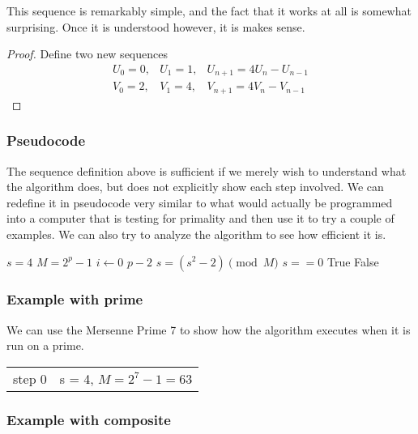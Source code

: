 This sequence is remarkably simple, and the fact that it works at all is somewhat surprising. Once it is understood however, it is makes sense.  
\begin{proof}
Define two new sequences
\begin{align}
U_0 = 0,& U_1 = 1,& U_{n+1} = 4U_n - U_{n-1}\\ 
V_0 = 2,& V_1 = 4,& V_{n+1} = 4V_n - V_{n-1}
\end{align}
\end{proof}



\subsubsection{Pseudocode}

The sequence definition above is sufficient if we merely wish to understand what the algorithm does, but does not explicitly show each step involved.  We can redefine it in pseudocode very similar to what would actually be programmed into a computer that is testing for primality and then use it to try a couple of examples. We can also try to analyze the algorithm to see how efficient it is.

\begin{codebox}
\li$s = 4$
\li$M = 2^p - 1$
\li \For $i \gets 0$ \To $p - 2$
\Do\li
$s = (s^2 - 2) \pmod{M}$
\End\li
\If $s == 0$
\Then
\li\Return True \li
\Else
\li\Return False \li
\End
\end{codebox}

\subsubsection{Example with prime}

We can use the Mersenne Prime 7 to show how the algorithm executes when it is run on a prime.
\begin{tabular}{ll}
step 0&s = 4, $M = 2^7 -1 = 63$
\end{tabular}

\subsubsection{Example with composite} 

